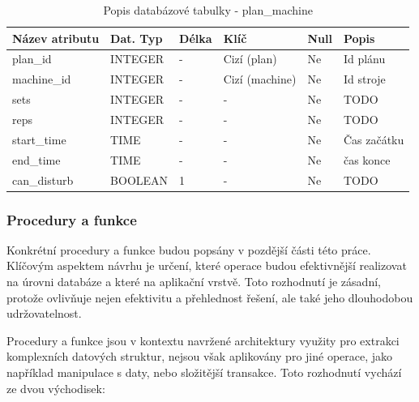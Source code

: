 \begin{table}[h!]
	\caption{Popis databázové tabulky - plan\_machine}
    \label{tab:dat-dictionary-plan-machine}
	\begin{tabular}{|p{3.5cm}|p{2cm}|p{1cm}|p{2.5cm}|p{.75cm}|p{3.75cm}|}
		\hline
        \textbf{Název atributu} & \textbf{Dat. Typ} & \textbf{Délka} & \textbf{Klíč} & \textbf{Null} & \textbf{Popis} \\
        \hline
            plan\_id        & INTEGER   &  -    & Cizí (plan)       & Ne & Id plánu \\
        \hline
            machine\_id     & INTEGER   &  -    & Cizí (machine)       & Ne & Id stroje \\
        \hline
            sets                & INTEGER   &  -   & -                 & Ne & TODO \\
        \hline
            reps                & INTEGER   &  -    & -                 & Ne &  TODO \\
            start\_time     & TIME      &  -    & -                 & Ne & Čas začátku \\
        \hline
            end\_time       & TIME      &  -    & -                 & Ne & čas konce \\
        \hline
            can\_disturb          & BOOLEAN   &  1    & -                 & Ne & TODO \\
        \hline
	\end{tabular}
\end{table}

\subsubsection{Procedury a funkce}
Konkrétní procedury a funkce budou popsány v pozdější části této práce. Klíčovým aspektem návrhu je určení, které operace budou efektivnější realizovat na úrovni databáze a které na aplikační vrstvě. Toto rozhodnutí je zásadní, protože ovlivňuje nejen efektivitu a přehlednost řešení, ale také jeho dlouhodobou udržovatelnost.

Procedury a funkce jsou v kontextu navržené architektury využity pro extrakci komplexních datových struktur, nejsou však aplikovány pro jiné operace, jako například manipulace s daty, nebo složitější transakce. Toto rozhodnutí vychází ze dvou východisek:

